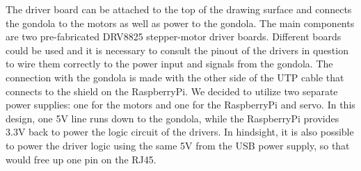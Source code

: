 \documentclass[a4paper,10pt]{article}
\begin{document}
The driver board can be attached to the top of the drawing surface and connects the gondola to the motors as well as power to the gondola. The main components are two pre-fabricated DRV8825 stepper-motor driver boards. Different boards could be used and it is necessary to consult the pinout of the drivers in question to wire them correctly to the power input and signals from the gondola. The connection with the gondola is made with the other side of the UTP cable that connects to the shield on the RaspberryPi. We decided to utilize two separate power supplies: one for the motors and one for the RaspberryPi and servo. In this design, one 5V line runs down to the gondola, while the RaspberryPi provides 3.3V back to power the logic circuit of the drivers. In hindsight, it is also possible to power the driver logic using the same 5V from the USB power supply, so that would free up one pin on the RJ45. 


\end{document}

